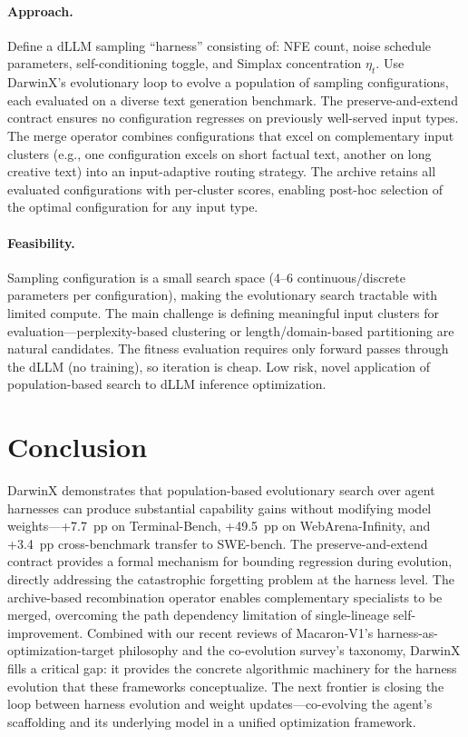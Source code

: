 \documentclass[11pt,a4paper]{article}
\begin{document}
\paragraph{Approach.} Define a dLLM sampling ``harness'' consisting of: NFE count, noise schedule parameters, self-conditioning toggle, and Simplax concentration $\eta_t$. Use DarwinX's evolutionary loop to evolve a population of sampling configurations, each evaluated on a diverse text generation benchmark. The preserve-and-extend contract ensures no configuration regresses on previously well-served input types. The merge operator combines configurations that excel on complementary input clusters (e.g., one configuration excels on short factual text, another on long creative text) into an input-adaptive routing strategy. The archive retains all evaluated configurations with per-cluster scores, enabling post-hoc selection of the optimal configuration for any input type.

\paragraph{Feasibility.} Sampling configuration is a small search space (4--6 continuous/discrete parameters per configuration), making the evolutionary search tractable with limited compute. The main challenge is defining meaningful input clusters for evaluation---perplexity-based clustering or length/domain-based partitioning are natural candidates. The fitness evaluation requires only forward passes through the dLLM (no training), so iteration is cheap. Low risk, novel application of population-based search to dLLM inference optimization.

\section{Conclusion}

DarwinX demonstrates that population-based evolutionary search over agent harnesses can produce substantial capability gains without modifying model weights---+7.7~pp on Terminal-Bench, +49.5~pp on WebArena-Infinity, and +3.4~pp cross-benchmark transfer to SWE-bench. The preserve-and-extend contract provides a formal mechanism for bounding regression during evolution, directly addressing the catastrophic forgetting problem at the harness level. The archive-based recombination operator enables complementary specialists to be merged, overcoming the path dependency limitation of single-lineage self-improvement. Combined with our recent reviews of Macaron-V1's harness-as-optimization-target philosophy and the co-evolution survey's taxonomy, DarwinX fills a critical gap: it provides the concrete algorithmic machinery for the harness evolution that these frameworks conceptualize. The next frontier is closing the loop between harness evolution and weight updates---co-evolving the agent's scaffolding and its underlying model in a unified optimization framework.
\end{document}
